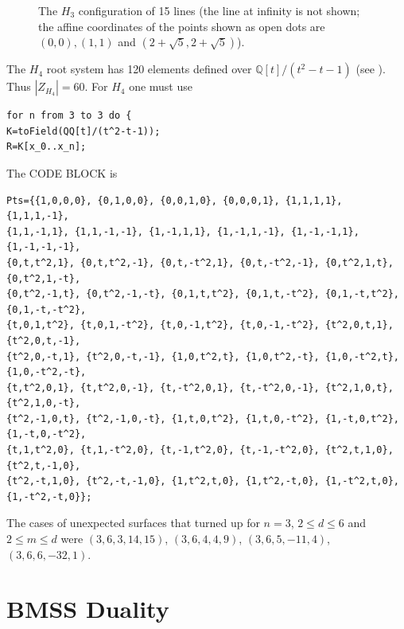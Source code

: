\documentclass[12pt]{amsart}
\numberwithin{equation}{section}
\theoremstyle{definition}
\newcommand{\QQ}{ \ensuremath{\mathbb{Q}}}
\begin{document}
\begin{figure}
\begin{center}
\caption{The $H_3$ configuration of 15 lines (the line at infinity is not shown; the affine coordinates of the points shown 
as open dots are $(0,0), (1,1)$ and $(2+\sqrt{5},2+\sqrt{5})$).}
\label{H3Fig}
\end{center}
\end{figure}

The $H_4$ root system has 120 elements defined over ${\QQ}[t]/(t^2-t-1)$
(see \cite{BFGMV,St}). Thus $|Z_{H_4}|=60$.
For $H_4$ one must use
\begin{verbatim}
for n from 3 to 3 do {
K=toField(QQ[t]/(t^2-t-1));
R=K[x_0..x_n];
\end{verbatim}
The CODE BLOCK is
{\tiny
\begin{verbatim}
Pts={{1,0,0,0}, {0,1,0,0}, {0,0,1,0}, {0,0,0,1}, {1,1,1,1}, {1,1,1,-1},
{1,1,-1,1}, {1,1,-1,-1}, {1,-1,1,1}, {1,-1,1,-1}, {1,-1,-1,1}, {1,-1,-1,-1},
{0,t,t^2,1}, {0,t,t^2,-1}, {0,t,-t^2,1}, {0,t,-t^2,-1}, {0,t^2,1,t}, {0,t^2,1,-t},
{0,t^2,-1,t}, {0,t^2,-1,-t}, {0,1,t,t^2}, {0,1,t,-t^2}, {0,1,-t,t^2}, {0,1,-t,-t^2},
{t,0,1,t^2}, {t,0,1,-t^2}, {t,0,-1,t^2}, {t,0,-1,-t^2}, {t^2,0,t,1}, {t^2,0,t,-1},
{t^2,0,-t,1}, {t^2,0,-t,-1}, {1,0,t^2,t}, {1,0,t^2,-t}, {1,0,-t^2,t}, {1,0,-t^2,-t},
{t,t^2,0,1}, {t,t^2,0,-1}, {t,-t^2,0,1}, {t,-t^2,0,-1}, {t^2,1,0,t}, {t^2,1,0,-t},
{t^2,-1,0,t}, {t^2,-1,0,-t}, {1,t,0,t^2}, {1,t,0,-t^2}, {1,-t,0,t^2}, {1,-t,0,-t^2},
{t,1,t^2,0}, {t,1,-t^2,0}, {t,-1,t^2,0}, {t,-1,-t^2,0}, {t^2,t,1,0}, {t^2,t,-1,0},
{t^2,-t,1,0}, {t^2,-t,-1,0}, {1,t^2,t,0}, {1,t^2,-t,0}, {1,-t^2,t,0}, {1,-t^2,-t,0}};
\end{verbatim}
}
The cases of unexpected surfaces that turned up for $n=3$, $2\leq d\leq 6$ and $2\leq m\leq d$ were
$({3, 6, 3, 14, 15})$,
$({3, 6, 4, 4, 9})$,
$({3, 6, 5, -11, 4})$,
$({3, 6, 6, -32, 1})$.


\section{BMSS Duality}\label{BMSSduality}
\end{document}
